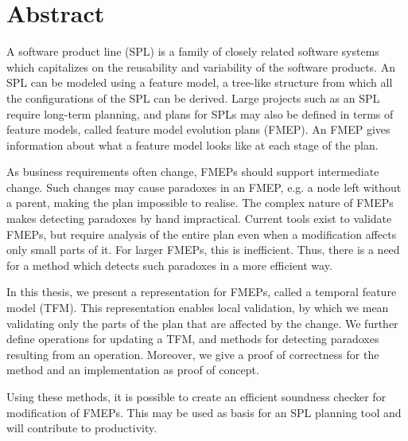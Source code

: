 \chapter*{Abstract}
A software product line (SPL) is a family of closely related software systems which capitalizes on the reusability and variability of the software products. 
An SPL can be modeled using a feature model, a tree-like structure from which all the configurations of the SPL can be derived.
Large projects such as an SPL require long-term planning, and plans for SPLs may also be defined in terms of feature models, called feature model evolution plans (FMEP). An FMEP gives information about what a feature model looks like at each stage of the plan.

As business requirements often change, FMEPs should support intermediate change. Such changes may cause paradoxes in an FMEP,  e.g. a node left without a parent, making the plan impossible to realise. The complex nature of FMEPs makes detecting paradoxes by hand impractical. Current tools exist to validate FMEPs, but require analysis of the entire plan even when a modification affects only small parts of it. For larger FMEPs, this is inefficient. Thus, there is a need for a method which detects such paradoxes in a more efficient way.

In this thesis, we present a representation for FMEPs, called a temporal feature model (TFM). This representation enables local validation, by which we mean validating only the parts of the plan that are affected by the change. We further define operations for updating a TFM, and methods for detecting paradoxes resulting from an operation. Moreover, we give a proof of correctness for the method and an implementation as proof of concept.
 
Using these methods, it is possible to create an efficient soundness checker for modification of FMEPs. This may be used as basis for an SPL planning tool and will contribute to productivity. 



